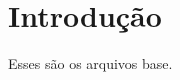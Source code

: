 \documentclass[12pt,a4paper]{article}
\begin{document}
\maketitle
\tableofcontents

\section{Introdução}
    Esses são os arquivos base.
    
\end{document}
